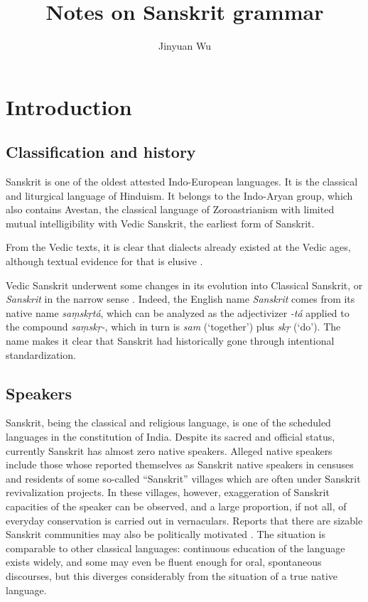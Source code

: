 \documentclass[a4paper, oneside, 12pt]{report}
\title{Notes on Sanskrit grammar}
\author{Jinyuan Wu}
\newcommand{\form}[1]{\emph{#1}}
\newcommand{\translate}[1]{`#1'}
\begin{document}
\maketitle

\chapter{Introduction}

\section{Classification and history}

Sanskrit is one of the oldest attested Indo-European languages.
It is the classical and liturgical language of Hinduism.
It belongs to the Indo-Aryan group,
which also contains Avestan, the classical language of Zoroastrianism
with limited mutual intelligibility with Vedic Sanskrit,
the earliest form of Sanskrit.

From the Vedic texts, it is clear that dialects already existed at the Vedic ages,
although textual evidence for that is elusive \citep{witzel1989tracing}.

Vedic Sanskrit underwent some changes in its evolution into Classical Sanskrit,
or \emph{Sanskrit} in the narrow sense \citep{burrow2001sanskrit}.
Indeed, the English name \form{Sanskrit} comes from its native name \form{saṃskṛtá},
which can be analyzed as the adjectivizer \form{-tá} applied to the compound \form{saṃskṛ-},
which in turn is \form{sam} (\translate{together}) 
plus \form{skṛ} (\translate{do}).
The name makes it clear that Sanskrit had historically gone through intentional standardization.

\section{Speakers}

Sanskrit, being the classical and religious language, 
is one of the scheduled languages in the constitution of India.
Despite its sacred and official status, currently Sanskrit has almost zero native speakers.
Alleged native speakers include those whose reported themselves as Sanskrit native speakers in censuses
and residents of some so-called ``Sanskrit'' villages which are often under Sanskrit revivalization projects.
In these villages, however, exaggeration of Sanskrit capacities of the speaker can be observed,
and a large proportion, if not all, of everyday conservation is carried out in vernaculars.
Reports that there are sizable Sanskrit communities may also be politically motivated
\citep{mccartney2017jhiri}.
The situation is comparable to other classical languages:
continuous education of the language exists widely,
and some may even be fluent enough for oral, spontaneous discourses,
but this diverges considerably from the situation of a true native language. 
\end{document}
